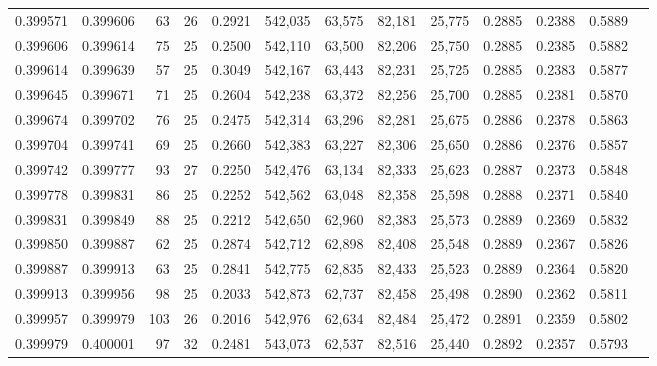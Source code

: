 \begin{tabular}{rrrrrrrrrrrrr}
0.399571 & 0.399606 &    63 &  26 &                                     0.2921 & 542,035 &  63,575 &  82,181 &  25,775 & 0.2885 & 0.2388 & 0.5889 \\
0.399606 & 0.399614 &    75 &  25 &                                     0.2500 & 542,110 &  63,500 &  82,206 &  25,750 & 0.2885 & 0.2385 & 0.5882 \\
0.399614 & 0.399639 &    57 &  25 &                                     0.3049 & 542,167 &  63,443 &  82,231 &  25,725 & 0.2885 & 0.2383 & 0.5877 \\
0.399645 & 0.399671 &    71 &  25 &                                     0.2604 & 542,238 &  63,372 &  82,256 &  25,700 & 0.2885 & 0.2381 & 0.5870 \\
0.399674 & 0.399702 &    76 &  25 &                                     0.2475 & 542,314 &  63,296 &  82,281 &  25,675 & 0.2886 & 0.2378 & 0.5863 \\
0.399704 & 0.399741 &    69 &  25 &                                     0.2660 & 542,383 &  63,227 &  82,306 &  25,650 & 0.2886 & 0.2376 & 0.5857 \\
0.399742 & 0.399777 &    93 &  27 &                                     0.2250 & 542,476 &  63,134 &  82,333 &  25,623 & 0.2887 & 0.2373 & 0.5848 \\
0.399778 & 0.399831 &    86 &  25 &                                     0.2252 & 542,562 &  63,048 &  82,358 &  25,598 & 0.2888 & 0.2371 & 0.5840 \\
0.399831 & 0.399849 &    88 &  25 &                                     0.2212 & 542,650 &  62,960 &  82,383 &  25,573 & 0.2889 & 0.2369 & 0.5832 \\
0.399850 & 0.399887 &    62 &  25 &                                     0.2874 & 542,712 &  62,898 &  82,408 &  25,548 & 0.2889 & 0.2367 & 0.5826 \\
0.399887 & 0.399913 &    63 &  25 &                                     0.2841 & 542,775 &  62,835 &  82,433 &  25,523 & 0.2889 & 0.2364 & 0.5820 \\
0.399913 & 0.399956 &    98 &  25 &                                     0.2033 & 542,873 &  62,737 &  82,458 &  25,498 & 0.2890 & 0.2362 & 0.5811 \\
0.399957 & 0.399979 &   103 &  26 &                                     0.2016 & 542,976 &  62,634 &  82,484 &  25,472 & 0.2891 & 0.2359 & 0.5802 \\
0.399979 & 0.400001 &    97 &  32 &                                     0.2481 & 543,073 &  62,537 &  82,516 &  25,440 & 0.2892 & 0.2357 & 0.5793 \\

\end{tabular}
